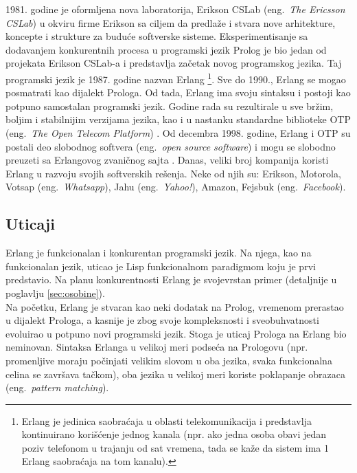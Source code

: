 \documentclass[a4paper]{article}
\begin{document}
{1981. godine je oformljena nova laboratorija, Erikson CSLab (eng.~{\em The Ericsson CSLab}) u okviru firme Erikson sa
ciljem da predlaže i stvara nove arhitekture, koncepte i strukture za buduće softverske sisteme.
Eksperimentisanje sa dodavanjem konkurentnih procesa u programski jezik Prolog je bio jedan
od projekata Erikson CSLab-a i predstavlja začetak novog programskog jezika.
Taj programski jezik je 1987. godine nazvan Erlang
\footnote{Erlang je jedinica saobraćaja u oblasti telekomunikacija 
i predstavlja kontinuirano korišćenje jednog kanala 
(npr. ako jedna osoba obavi jedan poziv telefonom u trajanju od sat vremena, 
tada se kaže da sistem ima 1 Erlang saobraćaja na tom kanalu).}.    
Sve do 1990., Erlang se mogao posmatrati kao dijalekt Prologa. Od tada, Erlang
ima svoju sintaksu i postoji kao potpuno samostalan programski jezik.
Godine rada su rezultirale u sve bržim, boljim i stabilnijim verzijama jezika, kao
i u nastanku standardne biblioteke OTP (eng.~{\em The Open Telecom Platform}) \cite{phdthesis}.
Od decembra 1998. godine, Erlang i OTP su postali deo slobodnog softvera (eng.~{\em open source software})
i mogu se slobodno preuzeti sa Erlangovog zvaničnog sajta \cite{sajt}.
Danas, veliki broj kompanija koristi Erlang u razvoju
svojih softverskih rešenja. Neke od njih su: Erikson, Motorola, Votsap (eng.~{\em Whatsapp}), 
Jahu (eng.~{\em Yahoo!}), Amazon, Fejsbuk (eng.~{\em Facebook}).


\subsection{Uticaji}
\label{subsec:uticaji}

Erlang je funkcionalan i konkurentan programski jezik.
Na njega, kao na funkcionalan jezik, uticao je Lisp funkcionalnom paradigmom koju je 
prvi predstavio. Na planu konkurentnosti Erlang je svojevrstan primer (detaljnije u poglavlju \ref{sec:osobine}). \\ 

Na početku, Erlang je stvaran kao neki dodatak na Prolog, vremenom prerastao u 
dijalekt Prologa, a kasnije je zbog svoje kompleksnosti i sveobuhvatnosti evoluirao
u potpuno novi programski jezik. Stoga je uticaj Prologa na Erlang bio 
neminovan. Sintaksa Erlanga u velikoj meri podseća na Prologovu 
(npr. promenljive moraju počinjati velikim slovom u oba jezika, 
svaka funkcionalna celina se završava tačkom), oba jezika u velikoj meri koriste poklapanje obrazaca
(eng.~{\em pattern matching}). \\

}
\end{document}
